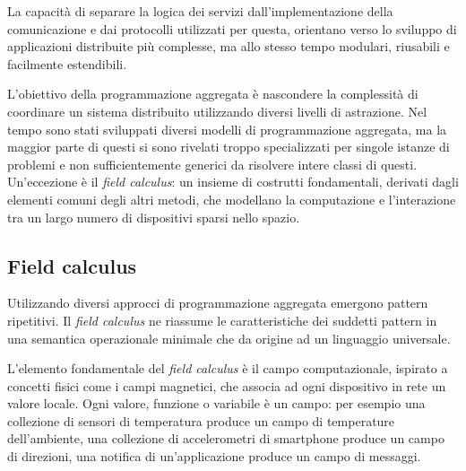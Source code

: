 La capacità di separare la logica dei servizi dall'implementazione della
comunicazione e dai protocolli utilizzati per questa, orientano verso lo
sviluppo di applicazioni distribuite più complesse, ma allo stesso tempo
modulari, riusabili e facilmente estendibili.

L'obiettivo della programmazione aggregata è nascondere la complessità di
coordinare un sistema distribuito utilizzando diversi livelli di astrazione.
Nel tempo sono stati sviluppati diversi modelli di programmazione aggregata, ma
la maggior parte di questi si sono rivelati troppo specializzati per singole
istanze di problemi e non sufficientemente generici da risolvere intere classi
di questi\cite{beal2012}. Un'eccezione è il \textit{field calculus}: un insieme
di costrutti fondamentali, derivati dagli elementi comuni degli altri metodi,
che modellano la computazione e l'interazione tra un largo numero di dispositivi
sparsi nello spazio.

\subsection{Field calculus}
Utilizzando diversi approcci di programmazione aggregata emergono pattern
ripetitivi. Il \textit{field calculus} \cite{Viroli2013} ne riassume le
caratteristiche dei suddetti pattern in una semantica operazionale minimale che
da origine ad un linguaggio universale\cite{spacetime}.

L'elemento fondamentale del \textit{field calculus} è il campo computazionale,
ispirato a concetti fisici come i campi magnetici, che associa ad ogni
dispositivo in rete un valore locale. Ogni valore, funzione o variabile è un
campo: per esempio una collezione di sensori di temperatura produce un campo di
temperature dell'ambiente, una collezione di accelerometri di smartphone produce
un campo di direzioni, una notifica di un'applicazione produce un campo di
messaggi.

